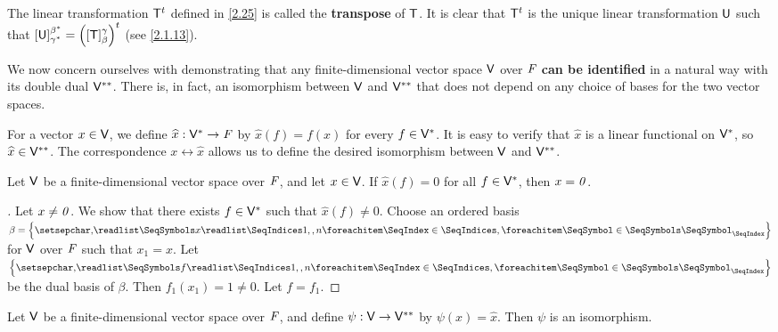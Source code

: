 \begin{note}
	The linear transformation \({\mathsf{T}}^{t}\) defined in \cref{2.25} is called the \textbf{transpose} of \(\mathsf{T}\).
	It is clear that \({\mathsf{T}}^{t}\) is the unique linear transformation \(\mathsf{U}\) such that \([\mathsf{U}]_{\gamma^*}^{\beta^*} = {\left\lparen[\mathsf{T}]_{\beta}^{\gamma}\right\rparen}^{t}\)
	(see \cref{2.1.13}).
\end{note}

\begin{note}
	We now concern ourselves with demonstrating that any finite-dimensional vector space \(\mathsf{V}\) over \(\mathit{F}\) \textbf{can be identified} in a natural way with its double dual \(\mathsf{V}^{**}\).
	There is, in fact, an isomorphism between \(\mathsf{V}\) and \(\mathsf{V}^{**}\) that does not depend on any choice of bases for the two vector spaces.
\end{note}

\begin{defn}\label{2.6.7}
	For a vector \(x \in \mathsf{V}\), we define \(\widehat{x} : \mathsf{V}^* \to \mathit{F}\) by \(\widehat{x}(f) = f(x)\) for every \(f \in \mathsf{V}^*\).
	It is easy to verify that \(\widehat{x}\) is a linear functional on \(\mathsf{V}^*\), so \(\widehat{x} \in \mathsf{V}^{**}\).
	The correspondence \(x \leftrightarrow \widehat{x}\) allows us to define the desired isomorphism between \(\mathsf{V}\) and \(\mathsf{V}^{**}\).
\end{defn}

\begin{lem}\label{2.6.8}
	Let \(\mathsf{V}\) be a finite-dimensional vector space over \(\mathit{F}\), and let \(x \in \mathsf{V}\).
	If \(\widehat{x}(f) = 0\) for all \(f \in \mathsf{V}^*\), then \(x = \mathit{0}\).
\end{lem}

\begin{proof}[]
	Let \(x \neq \mathit{0}\).
	We show that there exists \(f \in \mathsf{V}^*\) such that \(\widehat{x}(f) \neq 0\).
	Choose an ordered basis \(\beta = \set{\seq{x}{1,,n}}\) for \(\mathsf{V}\) over \(\mathit{F}\) such that \(x_1 = x\).
	Let \(\set{\seq{f}{1,,n}}\) be the dual basis of \(\beta\).
	Then \(f_1(x_1) = 1 \neq 0\).
	Let \(f = f_1\).
\end{proof}

\begin{thm}\label{2.26}
	Let \(\mathsf{V}\) be a finite-dimensional vector space over \(\mathit{F}\), and define \(\psi : \mathsf{V} \to \mathsf{V}^{**}\) by \(\psi(x) = \widehat{x}\).
	Then \(\psi\) is an isomorphism.
\end{thm}


